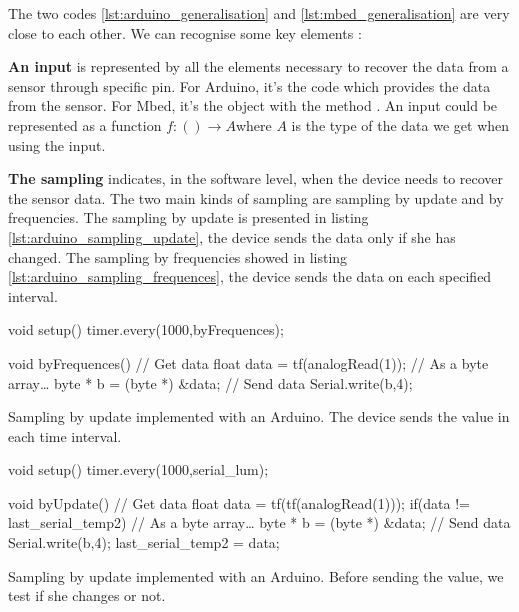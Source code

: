 The two codes \ref{lst:arduino_generalisation} and \ref{lst:mbed_generalisation}
are very close to each other. We can recognise some key elements :

\textbf{An input} is represented by all the elements necessary to recover the
data from a sensor through specific pin. For Arduino, it’s the code
 which provides the data from the sensor. For
Mbed, it’s the object  with the method .
An input could be represented as a function $f : () \rightarrow A$where $A$ is
the type of the data we get when using the input.

\textbf{The sampling} indicates, in the software level, when the device needs
to recover the sensor data. The two main kinds of sampling are sampling by
update and by frequencies. The sampling by update is presented in
listing \ref{lst:arduino_sampling_update}, the device sends the data only if she has
changed. The sampling by frequencies showed in listing
\ref{lst:arduino_sampling_frequences}, the device sends the data on each
specified interval.

\begin{listing}[H]
  \centering
\begin{scalacode}
void setup(){
  timer.every(1000,byFrequences);
}

void byFrequences(){
  // Get data
  float data = tf(analogRead(1));
  // As a byte array…
  byte * b = (byte *) &data;
  // Send data
  Serial.write(b,4);
}
\end{scalacode}
  \caption[Sampling by frequencies implemented with an Arduino]{Sampling by update
    implemented with an Arduino. The device sends the value in each time interval.}
  \label{lst:arduino_sampling_update}
\end{listing}

\begin{listing}[H]
  \centering
\begin{scalacode}
void setup(){
  timer.every(1000,serial_lum);
}

void byUpdate(){
  // Get data
  float data = tf(tf(analogRead(1)));
  if(data != last_serial_temp2) {
    // As a byte array…
    byte * b = (byte *) &data;
    // Send data
    Serial.write(b,4);
  }
  last_serial_temp2 = data;
}
\end{scalacode}
  \caption[Sampling by update implemented with an Arduino]{Sampling by update
    implemented with an Arduino. Before sending the value, we test if she
    changes or not.}
  \label{lst:arduino_sampling_frequences}
\end{listing}

